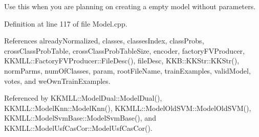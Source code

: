 Use this when you are planning on creating a empty model without parameters. 



Definition at line 117 of file Model.\+cpp.



References already\+Normalized, classes, classes\+Index, class\+Probs, cross\+Class\+Prob\+Table, cross\+Class\+Prob\+Table\+Size, encoder, factory\+F\+V\+Producer, K\+K\+M\+L\+L\+::\+Factory\+F\+V\+Producer\+::\+File\+Desc(), file\+Desc, K\+K\+B\+::\+K\+K\+Str\+::\+K\+K\+Str(), norm\+Parms, num\+Of\+Classes, param, root\+File\+Name, train\+Examples, valid\+Model, votes, and we\+Own\+Train\+Examples.



Referenced by K\+K\+M\+L\+L\+::\+Model\+Dual\+::\+Model\+Dual(), K\+K\+M\+L\+L\+::\+Model\+Knn\+::\+Model\+Knn(), K\+K\+M\+L\+L\+::\+Model\+Old\+S\+V\+M\+::\+Model\+Old\+S\+V\+M(), K\+K\+M\+L\+L\+::\+Model\+Svm\+Base\+::\+Model\+Svm\+Base(), and K\+K\+M\+L\+L\+::\+Model\+Usf\+Cas\+Cor\+::\+Model\+Usf\+Cas\+Cor().


